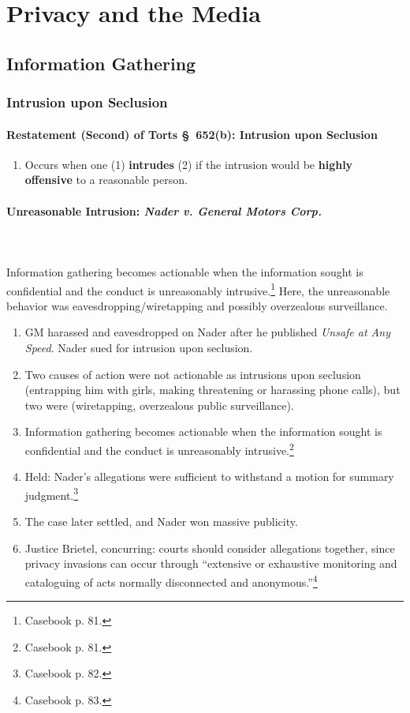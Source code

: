 \section{Privacy and the Media}

\subsection{Information Gathering}

\subsubsection{Intrusion upon Seclusion}

\paragraph{Restatement (Second) of Torts \S\ 652(b): Intrusion upon Seclusion}

\begin{enumerate}
    \item Occurs when one (1) \textbf{intrudes} (2) if the intrusion would be 
    \textbf{highly offensive} to a reasonable person.
\end{enumerate}

\paragraph{Unreasonable Intrusion: \emph{Nader v. General Motors Corp.}}
~\\\\
Information gathering becomes actionable when the information sought is 
confidential and the conduct is unreasonably intrusive.\footnote{Casebook p. 
81.} Here, the unreasonable behavior was eavesdropping/wiretapping and possibly 
overzealous surveillance.

\begin{enumerate}
    \item GM harassed and eavesdropped on Nader after he published \emph{Unsafe 
    at Any Speed}. Nader sued for intrusion upon seclusion.
    \item Two causes of action were not actionable as intrusions upon seclusion 
    (entrapping him with girls, making threatening or harassing phone calls), 
    but two were (wiretapping, overzealous public surveillance).
    \item Information gathering becomes actionable when the information sought 
    is confidential and the conduct is unreasonably intrusive.\footnote{Casebook 
    p. 81.}
    \item Held: Nader's allegations were sufficient to withstand a motion for 
    summary judgment.\footnote{Casebook p. 82.}
    \item The case later settled, and Nader won massive publicity.
    \item Justice Brietel, concurring: courts should consider allegations 
    together, since privacy invasions can occur through ``extensive or 
    exhaustive monitoring and cataloguing of acts normally disconnected and 
    anonymous.''\footnote{Casebook p. 83.}
\end{enumerate}

